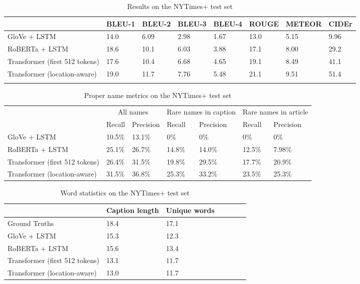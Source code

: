 \documentclass[10pt,twocolumn,letterpaper]{article}
\begin{document}
\begin{table}[t]
	\caption {Results on the NYTimes+ test set}
	\label{tab:results-nytimes}
	\centering
	\begin{tabular}{llllllll}
		\toprule
		  & BLEU-1  & BLEU-2 & BLEU-3 & BLEU-4 & ROUGE & METEOR & CIDEr \\
      \midrule
      GloVe + LSTM & 14.0 & 6.09 & 2.98 & 1.67 & 13.0 & 5.15 & 9.96 \\
      RoBERTa + LSTM & 18.6 & 10.1 & 6.03 & 3.88 & 17.1 & 8.00 & 29.2 \\
      Transformer (first 512 tokens) & 17.6 & 10.4 & 6.68 & 4.65 & 19.1 & 8.49 & 41.1 \\
      Transformer (location-aware) & 19.0 & 11.7 & 7.76 & 5.48 & 21.1 & 9.51 & 51.4 \\
      \\
		\bottomrule
	\end{tabular}
\end{table}

\begin{table}[t]
	\caption {Proper name metrics on the NYTimes+ test set}
	\label{tab:results-names}
	\centering
	\begin{tabular}{lllllll}
		\toprule
        & \multicolumn{2}{c}{All names} & \multicolumn{2}{c}{Rare names in caption } & \multicolumn{2}{c}{Rare names in article } \\
        & Recall  & Precision & Recall  & Precision & Recall  & Precision \\
      \midrule
      GloVe + LSTM & 10.5\% & 13.1\% & 0\% & 0\% & 0\% & 0\%  \\
      RoBERTa + LSTM & 25.1\% & 26.7\% & 14.8\% & 14.0\% & 12.5\% & 7.98\%  \\
      Transformer (first 512 tokens) & 26.4\% & 31.5\% & 19.8\% & 29.5\% & 17.7\% & 20.9\%  \\
      Transformer (location-aware) & 31.5\% & 36.8\% & 25.3\% & 33.2\% & 23.5\% & 25.3\%   \\
		\bottomrule
	\end{tabular}
\end{table}

\begin{table}[t]
	\caption {Word statistics on the NYTimes+ test set}
	\label{tab:results-stats}
	\centering
	\begin{tabular}{lllllll}
		\toprule
        & Caption length  & Unique words \\
      \midrule
      Ground Truths & 18.4 & 17.1 \\
      GloVe + LSTM  & 15.3 & 12.3 \\
      RoBERTa + LSTM  & 15.6 & 13.4 \\
      Transformer (first 512 tokens)  & 13.1 & 11.7 \\
      Transformer (location-aware) & 13.0 & 11.7  \\
		\bottomrule
	\end{tabular}
\end{table}
\end{document}

